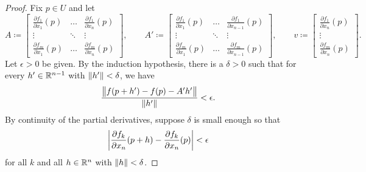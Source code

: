 \begin{proof}
Fix $p \in U$ and let
\begin{equation*}
A \coloneqq 
\begin{bmatrix}
\frac{\partial f_1}{\partial x_1}(p)
& \ldots &
\frac{\partial f_1}{\partial x_n}(p)
\\
\vdots & \ddots & \vdots
\\
\frac{\partial f_m}{\partial x_1}(p)
& \ldots &
\frac{\partial f_m}{\partial x_n}(p)
\end{bmatrix} ,
\qquad
A' \coloneqq 
\begin{bmatrix}
\frac{\partial f_1}{\partial x_1}(p)
& \ldots &
\frac{\partial f_1}{\partial x_{n-1}}(p)
\\
\vdots & \ddots & \vdots
\\
\frac{\partial f_m}{\partial x_1}(p)
& \ldots &
\frac{\partial f_m}{\partial x_{n-1}}(p)
\end{bmatrix} ,
\qquad
v \coloneqq 
\begin{bmatrix}
\frac{\partial f_1}{\partial x_n}(p)
\\
\vdots
\\
\frac{\partial f_m}{\partial x_n}(p)
\end{bmatrix} .
\end{equation*}
Let $\epsilon > 0$ be given.  By the induction hypothesis, there
is a $\delta > 0$ such that
for every $h' \in {\mathbb{R}}^{n-1}$ with $\lVert {h'} \rVert < \delta$, we have
\begin{equation*}
\frac{\bigl\lVert {f(p+h') - f(p) - A' h'} \bigr\rVert}{\lVert {h'} \rVert} < \epsilon .
\end{equation*}
By continuity of the partial derivatives, suppose $\delta$ is small
enough so that
\begin{equation*}
\left\lvert {\frac{\partial f_k}{\partial x_n}(p+h)
      - \frac{\partial f_k}{\partial x_n}(p)} \right\rvert < \epsilon
\end{equation*}
for all $k$ and all $h \in {\mathbb{R}}^n$ with $\lVert {h} \rVert < \delta$.


\end{proof}
